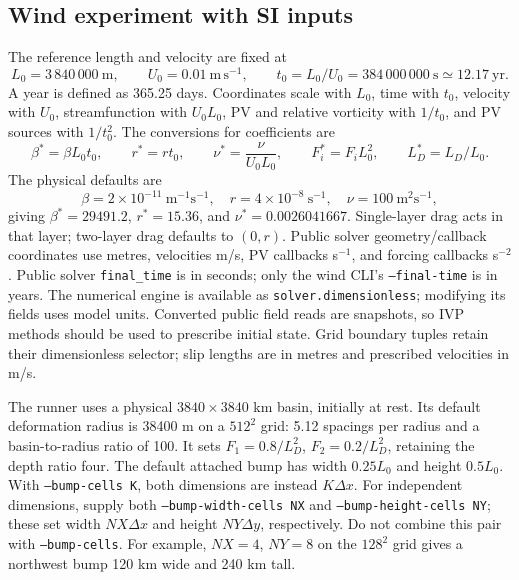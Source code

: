 \documentclass[11pt]{article}
\begin{document}
\subsection{Wind experiment with SI inputs}

The reference length and velocity are fixed at
\[
 L_0=3\,840\,000\ \mathrm{m},\qquad U_0=0.01\ \mathrm{m\,s^{-1}},\qquad
 t_0=L_0/U_0=384\,000\,000\ \mathrm{s}\simeq12.17\ \mathrm{yr}.
\]
A year is defined as 365.25 days. Coordinates scale with $L_0$, time
with $t_0$, velocity with $U_0$, streamfunction with $U_0L_0$, PV and
relative vorticity with $1/t_0$, and PV sources with $1/t_0^2$.
The conversions for coefficients are
\[
 \beta^*=\beta L_0t_0,\qquad r^*=rt_0,\qquad
 \nu^*=\frac{\nu}{U_0L_0},\qquad F_i^*=F_iL_0^2,\qquad
 L_D^*=L_D/L_0.
\]
The physical defaults are
\[
 \beta=2\times10^{-11}\ \mathrm{m^{-1}s^{-1}},\quad
 r=4\times10^{-8}\ \mathrm{s^{-1}},\quad
 \nu=100\ \mathrm{m^2s^{-1}},
\]
giving $\beta^*=29491.2$, $r^*=15.36$, and $\nu^*=0.0026041667$.
Single-layer drag acts in that layer; two-layer drag defaults to $(0,r)$.
Public solver geometry/callback coordinates use metres, velocities m/s,
PV callbacks s$^{-1}$, and forcing callbacks s$^{-2}$. Public solver
\texttt{final\_time} is in seconds; only the wind CLI's
\texttt{--final-time} is in years. The numerical engine is available as
\texttt{solver.dimensionless}; modifying its fields uses model units.
Converted public field reads are snapshots, so IVP methods should be used
to prescribe initial state. Grid boundary tuples retain their dimensionless
selector; slip lengths are in metres and prescribed velocities in m/s.

The runner uses a physical $3840\times3840$ km basin, initially at rest.
Its default deformation radius is 38400 m on a $512^2$ grid: 5.12 spacings
per radius and a basin-to-radius ratio of 100. It sets
$F_1=0.8/L_D^2$, $F_2=0.2/L_D^2$, retaining the depth ratio four.
The default attached bump has width $0.25L_0$ and height $0.5L_0$.
With \texttt{--bump-cells K}, both dimensions are instead $K\Delta x$.
For independent dimensions, supply both \texttt{--bump-width-cells NX}
and \texttt{--bump-height-cells NY}; these set width $NX\Delta x$ and
height $NY\Delta y$, respectively. Do not combine this pair with
\texttt{--bump-cells}. For example, $NX=4$, $NY=8$ on the $128^2$ grid
gives a northwest bump 120 km wide and 240 km tall.
\end{document}
